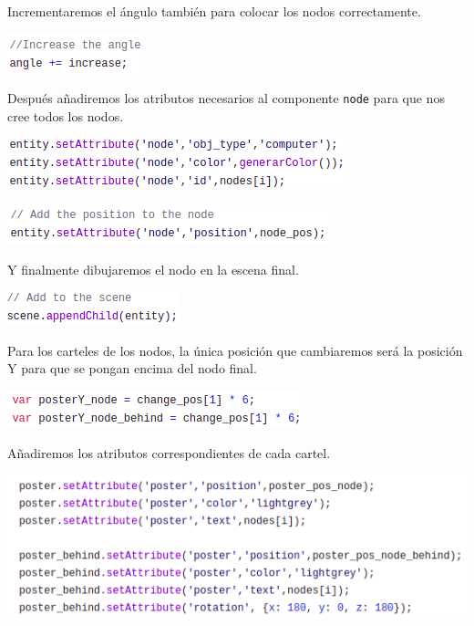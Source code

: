 \documentclass[a4paper, 12pt]{book}
\begin{document}
Incrementaremos el ángulo también para colocar los nodos correctamente.

\begin{center}
    \includegraphics[scale=0.7]{img/angleincr_comp_netsim.png}
\end{center}


Después añadiremos los atributos necesarios al componente \texttt{node} para que nos cree todos los nodos.


\begin{center}
    \includegraphics[scale=0.7]{img/node1_comp_netsim.png}
\end{center}


\begin{center}
    \includegraphics[scale=0.7]{img/node2_comp_netsim.png}
\end{center}

Y finalmente dibujaremos el nodo en la escena final.

\begin{center}
    \includegraphics[scale=0.7]{img/escenanode_comp_netsim.png}
\end{center}

Para los carteles de los nodos, la única posición que cambiaremos será la posición Y para que se pongan encima del nodo final.

\begin{center}
    \includegraphics[scale=0.7]{img/posterY_comp_netsim.png}
\end{center}

\newpage
Añadiremos los atributos correspondientes de cada cartel.

\begin{center}
    \includegraphics[scale=0.7]{img/atribposter_comp_netsim.png}
\end{center}
\end{document}
